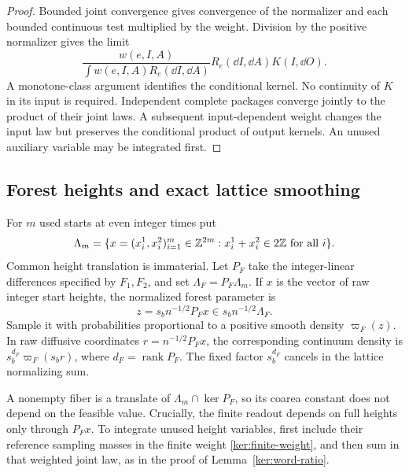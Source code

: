 \begin{proof}
Bounded joint convergence gives convergence of the normalizer and
each bounded continuous test multiplied by the weight.  Division
by the positive normalizer gives the limit
\[
 \frac{w(e,I,A)}{\int w(e,I,A)R_e(\dd I,\dd A)}
 R_e(\dd I,\dd A)K(I,\dd O).
\]
A monotone-class argument identifies the conditional kernel.
No continuity of \(K\) in its input is required.
Independent complete packages converge jointly to the product of
their joint laws.  A subsequent input-dependent weight changes the
input law but preserves the conditional product of output kernels.
An unused auxiliary variable may be integrated first.
\end{proof}

\subsection{Forest heights and exact lattice smoothing}

\begin{notation}\label{ker:lattice}
For \(m\) used starts at even integer times put
\[
 \Lambda_m=\{x=(x_i^1,x_i^2)_{i=1}^m\in\mathbb Z^{2m}:
                    x_i^1+x_i^2\in2\mathbb Z\text{ for all }i\}.
\]
Common height translation is immaterial.  Let \(P_F\) take the
integer-linear differences specified by \(F_1,F_2\), and set
\(\Lambda_F=P_F\Lambda_m\).
If \(x\) is the vector of raw integer start heights, the normalized
forest parameter is
\begin{equation}\label{ker:forest-units}
 z=s_b n^{-1/2}P_Fx\in s_b n^{-1/2}\Lambda_F.
\end{equation}
Sample it with probabilities proportional to a positive smooth density
\(\varpi_F(z)\).  In raw diffusive coordinates \(r=n^{-1/2}P_Fx\), the
corresponding continuum density is
\(s_b^{d_F}\varpi_F(s_br)\), where \(d_F=\operatorname{rank}P_F\).
The fixed factor \(s_b^{d_F}\) cancels in the lattice normalizing sum.
\end{notation}

A nonempty fiber is a translate of \(\Lambda_m\cap\ker P_F\), so its
coarea constant does not depend on the feasible value.  Crucially,
the finite readout depends on full heights only through \(P_Fx\).
To integrate unused height variables, first include their reference
sampling masses in the finite weight \eqref{ker:finite-weight}, and then
sum in that weighted joint law, as in the proof of
Lemma~\ref{ker:word-ratio}.

